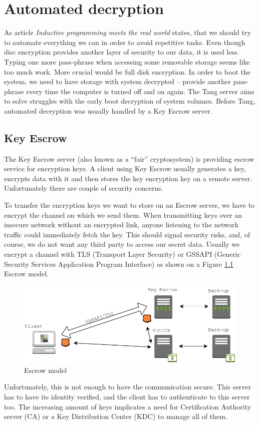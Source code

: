 \chapter{Automated decryption}

As article {\it Inductive programming meets the real world} \cite{Gulwani2015} states, that we should try to automate everything we can in order to avoid repetitive tasks.
Even though disc encryption provides another layer of security to our data, it is used less.
Typing one more pass-phrase when accessing some removable storage seems like too much work.
More crucial would be full disk encryption.
In order to boot the system, we need to have storage with system decrypted -- provide another pass-phrase every time the computer is turned off and on again.
The Tang server aims to solve struggles with the early boot decryption of system volumes.
Before Tang, automated decryption was usually handled by a Key Escrow server.

\section{Key Escrow}\label{escrow}

The Key Escrow server (also known as a “fair” cryptosystem) is providing escrow service for encryption keys.
A client using Key Escrow usually generates a key, encrypts data with it and then stores the key encryption key on a remote server.
Unfortunately there are couple of security concerns.

To transfer the encryption keys we want to store on an Escrow server, we have to encrypt the channel on which we send them.
When transmitting keys over an insecure network without an encrypted link, anyone listening to the network traffic could immediately fetch the key.
This should signal security risks, and, of course, we do not want any third party to access our secret data.
Usually we encrypt a channel with TLS (Transport Layer Security) or GSSAPI (Generic Security Services Application Program Interface) as shown on a Figure \ref{fig_escrowmodel} Escrow model.
\begin{figure}[h]
    \centering
    \includegraphics[scale=0.7]{figures/EscrowModel.pdf}
    \caption{Escrow model}
    \label{fig_escrowmodel}
\end{figure}
Unfortunately, this is not enough to have the communication secure.
This server has to have its identity verified, and the client has to authenticate to this server too.
The increasing amount of keys implicates a need for Certification Authority server (CA) or a Key Distribution Center (KDC) to manage all of them.

